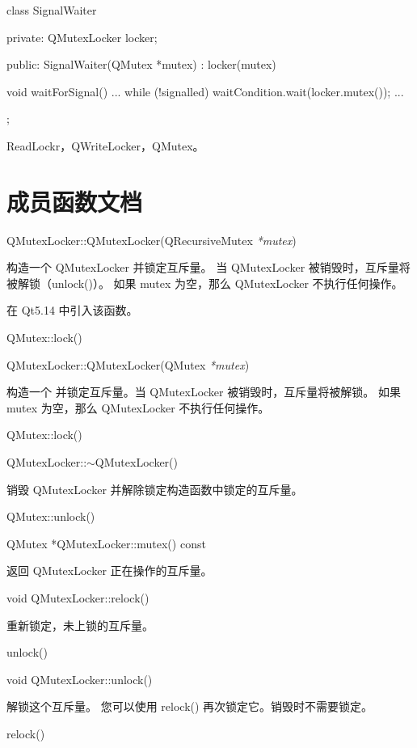 \begin{cppcode}
    class SignalWaiter
    {
    private:
        QMutexLocker locker;

    public:
        SignalWaiter(QMutex *mutex)
            : locker(mutex)
        {
        }

        void waitForSignal()
        {
            ...
            while (!signalled)
                waitCondition.wait(locker.mutex());
            ...
        }
    };
\end{cppcode}

\begin{seeAlso}
ReadLockr，QWriteLocker，QMutex。
\end{seeAlso}


\section{成员函数文档}

QMutexLocker::QMutexLocker(QRecursiveMutex \emph{*mutex})

构造一个 QMutexLocker 并锁定互斥量。
当 QMutexLocker 被销毁时，互斥量将被解锁（unlock()）。
如果 mutex 为空，那么 QMutexLocker 不执行任何操作。

在 Qt5.14 中引入该函数。

\begin{seeAlso}
QMutex::lock()
\end{seeAlso}

QMutexLocker::QMutexLocker(QMutex \emph{*mutex})

构造一个 并锁定互斥量。当 QMutexLocker 被销毁时，互斥量将被解锁。
如果 mutex 为空，那么 QMutexLocker 不执行任何操作。

\begin{seeAlso}
QMutex::lock()
\end{seeAlso}

QMutexLocker::$\sim$QMutexLocker()

销毁 QMutexLocker 并解除锁定构造函数中锁定的互斥量。

\begin{seeAlso}
QMutex::unlock()
\end{seeAlso}

QMutex *QMutexLocker::mutex() const

返回 QMutexLocker 正在操作的互斥量。

void QMutexLocker::relock()

重新锁定，未上锁的互斥量。

\begin{seeAlso}
unlock()
\end{seeAlso}

void QMutexLocker::unlock()

解锁这个互斥量。
您可以使用 relock() 再次锁定它。销毁时不需要锁定。

\begin{seeAlso}
relock()
\end{seeAlso}